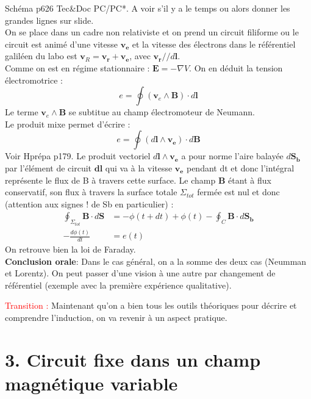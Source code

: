 \documentclass[french, a4paper, 10pt, twocolumn, landscape]{article}
\begin{document}
Schéma p626 Tec\&Doc PC/PC*. A voir s'il y a le temps ou alors donner les grandes lignes sur slide.\\
 On se place dans un cadre non relativiste et on prend un circuit filiforme ou le circuit est animé d'une vitesse $\mathbf{v_e}$ et la vitesse des électrons dans le référentiel galiléen du labo est $\mathbf{v}_R= \mathbf{v_r} + \mathbf{v_e}$, avec $\mathbf{v_r} // d\mathbf{l}$. \\
 
 Comme on est en régime stationnaire :    $\mathbf E = - \nabla V$. On en déduit la tension électromotrice :
 \begin{equation}
     e = \oint (\mathbf v_e \land \mathbf B) \cdot d\mathbf{l}
 \end{equation}
 Le terme $\mathbf v_e \land \mathbf B$ se subtitue au champ électromoteur de Neumann.\\
 
 Le produit mixe permet d'écrire : 
 \begin{equation}
     e = \oint (d\mathbf {l} \land \mathbf{v_e}) \cdot d\mathbf{B} 
 \end{equation}
Voir Hprépa p179. Le produit vectoriel $d\mathbf {l} \land \mathbf{v_e}$ a pour norme l'aire balayée $d\mathbf{S_b}$ par l'élément de circuit $\mathbf{dl}$ qui va à la vitesse $\mathbf{v_e}$ pendant dt et donc l'intégral représente le flux de B à travers cette surface. Le champ $\mathbf{B}$ étant à flux conservatif, son flux à travers la surface totale $\Sigma_{tot}$ fermée est nul et donc (attention aux signes ! de Sb en particulier) :
\begin{align}
    \oint_{\Sigma_{tot}}\mathbf{B}\cdot d\mathbf{S} &= -\phi(t+dt) + \phi(t) - \oint_{C}\mathbf{B}\cdot d\mathbf{S_b} \\
    -\frac{d\phi(t)}{dt} &= e(t)
\end{align}
On retrouve bien la loi de Faraday.\\

\textbf{Conclusion orale}: Dans le cas général, on a la somme des deux cas (Neumman et Lorentz). On peut passer d'une vision à une autre par changement de référentiel (exemple avec la première expérience qualitative).

\textcolor{red}{Transition :} Maintenant qu'on a bien tous les outils théoriques pour décrire et comprendre l'induction, on va revenir à un aspect pratique.



\section*{3. Circuit fixe dans un champ magnétique variable}
\end{document}
